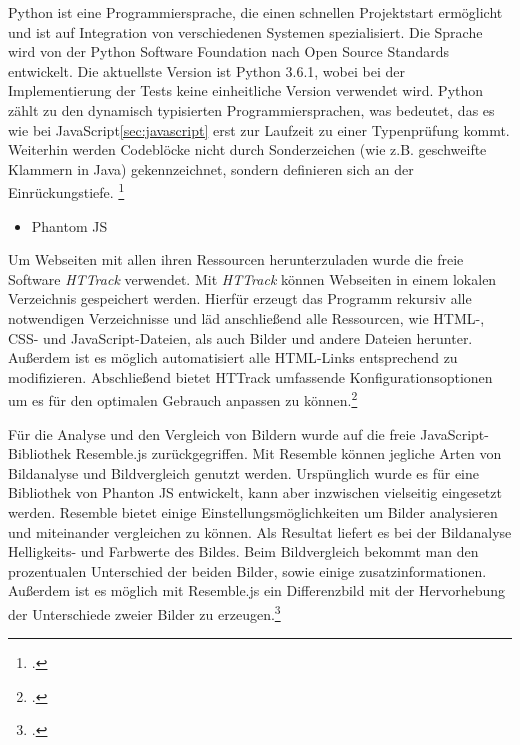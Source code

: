 Python ist eine Programmiersprache, die einen schnellen Projektstart ermöglicht und ist auf Integration von verschiedenen Systemen spezialisiert.
Die Sprache wird von der Python Software Foundation nach Open Source Standards entwickelt.
Die aktuellste Version ist Python 3.6.1, wobei bei der Implementierung der Tests keine einheitliche Version verwendet wird.
Python zählt zu den dynamisch typisierten Programmiersprachen, was bedeutet, das es wie bei JavaScript\ref{sec:javascript} erst zur Laufzeit zu einer Typenprüfung kommt.
Weiterhin werden Codeblöcke nicht durch Sonderzeichen (wie z.B. geschweifte Klammern in Java) gekennzeichnet, sondern definieren sich an der Einrückungstiefe.
\footcite{pythonHomepage}

\begin{itemize}
    \item Phantom JS \newline {}
\end{itemize}

Um Webseiten mit allen ihren Ressourcen herunterzuladen wurde die freie Software \textit{HTTrack} verwendet. Mit \textit{HTTrack} können Webseiten in einem lokalen Verzeichnis gespeichert werden. Hierfür erzeugt das Programm rekursiv alle notwendigen Verzeichnisse und läd anschließend alle Ressourcen, wie \ac{HTML}-, \ac{CSS}- und JavaScript-Dateien, als auch Bilder und andere Dateien herunter. Außerdem ist es möglich automatisiert alle \ac{HTML}-Links entsprechend zu modifizieren. Abschließend bietet HTTrack umfassende Konfigurationsoptionen um es für den optimalen Gebrauch anpassen zu können.\footcite[Vgl.][]{httrack}

Für die Analyse und den Vergleich von Bildern wurde auf die freie JavaScript-Bibliothek Resemble.js zurückgegriffen. Mit Resemble können jegliche Arten von Bildanalyse und Bildvergleich genutzt werden. Urspünglich wurde es für eine Bibliothek von Phanton JS entwickelt, kann aber inzwischen vielseitig eingesetzt werden. Resemble bietet einige Einstellungsmöglichkeiten um Bilder analysieren und miteinander vergleichen zu können. Als Resultat liefert es bei der Bildanalyse Helligkeits- und Farbwerte des Bildes. Beim Bildvergleich bekommt man den prozentualen Unterschied der beiden Bilder, sowie einige zusatzinformationen. Außerdem ist es möglich mit Resemble.js ein Differenzbild mit der Hervorhebung der Unterschiede zweier Bilder zu erzeugen.\footcite[Vgl.][]{resemblejs}

